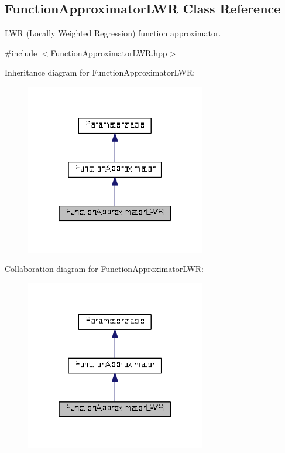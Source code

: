 \hypertarget{classDmpBbo_1_1FunctionApproximatorLWR}{\subsection{Function\+Approximator\+L\+W\+R Class Reference}
\label{classDmpBbo_1_1FunctionApproximatorLWR}
}


L\+W\+R (Locally Weighted Regression) function approximator.  




{\ttfamily \#include $<$Function\+Approximator\+L\+W\+R.\+hpp$>$}



Inheritance diagram for Function\+Approximator\+L\+W\+R\+:
\nopagebreak
\begin{figure}[H]
\begin{center}
\leavevmode
\includegraphics[width=223pt]{classDmpBbo_1_1FunctionApproximatorLWR__inherit__graph}
\end{center}
\end{figure}


Collaboration diagram for Function\+Approximator\+L\+W\+R\+:
\nopagebreak
\begin{figure}[H]
\begin{center}
\leavevmode
\includegraphics[width=223pt]{classDmpBbo_1_1FunctionApproximatorLWR__coll__graph}
\end{center}
\end{figure}
